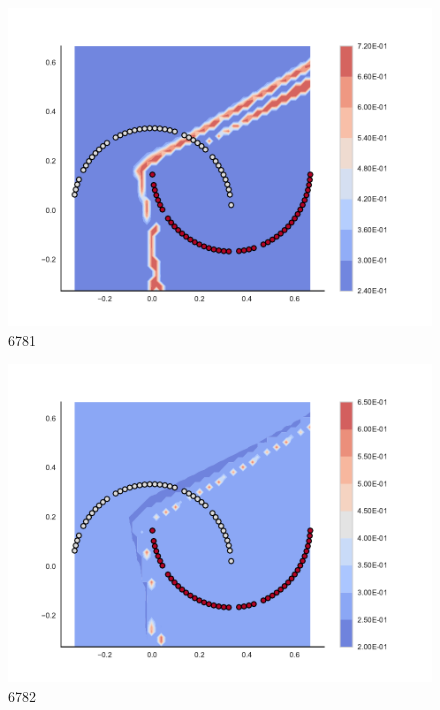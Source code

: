 \begin{subfigure}[b]{0.09\textwidth}
    \includegraphics[clip, trim=2.35cm 1.75cm 4.5cm 0cm,width=\textwidth]{img/convergence/6781.pdf}
    \caption{6781}
    \label{fig:convergence_6781}
\end{subfigure}
%
\begin{subfigure}[b]{0.09\textwidth}
    \includegraphics[clip, trim=2.35cm 1.75cm 4.5cm 0cm,width=\textwidth]{img/convergence/6782.pdf}
    \caption{6782}
    \label{fig:convergence_6782}
\end{subfigure}
%
